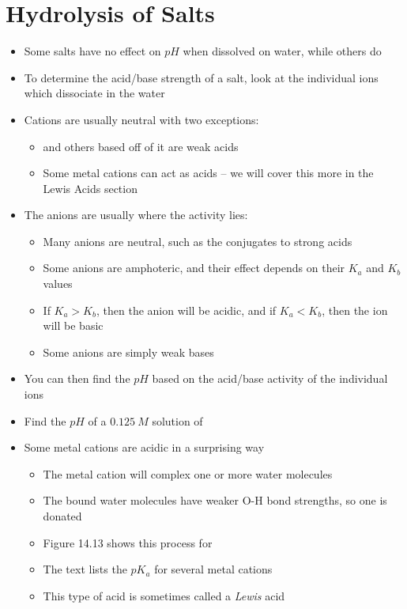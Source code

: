 \documentclass[12pt, openany, letterpaper]{memoir}
\begin{document}
\section{Hydrolysis of Salts}
\begin{itemize}
  \item Some salts have no effect on $pH$ when dissolved on water, while others do
	\item To determine the acid/base strength of a salt, look at the individual ions which dissociate in the water
	\item Cations are usually neutral with two exceptions:
	\begin{itemize}
		\item {} and others based off of it are weak acids
		\item Some metal cations can act as acids -- we will cover this more in the Lewis Acids section
	\end{itemize}
	\item The anions are usually where the activity lies:
	\begin{itemize}
		\item Many anions are neutral, such as the conjugates to strong acids
		\item Some anions are amphoteric, and their effect depends on their $K_a$ and $K_b$ values
		\item If $K_a>K_b$, then the anion will be acidic, and if $K_a<K_b$, then the ion will be basic
		\item Some anions are simply weak bases
	\end{itemize}
	\item You can then find the $pH$ based on the acid/base activity of the individual ions
	\item Find the $pH$ of a $0.125~M$ solution of 
  \item Some metal cations are acidic in a surprising way
    \begin{itemize}
      \item The metal cation will complex one or more water molecules
      \item The bound water molecules have weaker O-H bond strengths, so one  is donated
      \item Figure 14.13 shows this process for 
      \item The text lists the $pK_a$ for several metal cations
      \item This type of acid is sometimes called a \emph{Lewis} acid
    \end{itemize}
\end{itemize}
\end{document}
